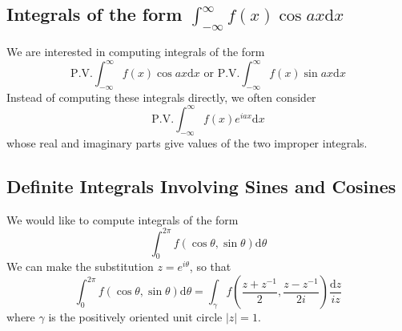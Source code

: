 \documentclass[12pt]{article}
\newcommand{\diff}{\mathrm{d}}
\theoremstyle{definition}
\begin{document}
\subsection{Integrals of the form {$\int_{-\infty}^\infty f(x)\cos ax\diff x$ }}
We are interested in computing integrals of the form
\[
\text{P.V.}\int_{-\infty}^\infty f(x)\cos ax\diff x \text{ or }\text{P.V.}\int_{-\infty}^\infty f(x)\sin ax\diff x
\]
Instead of computing these integrals directly, we often consider 
\[
\text{P.V.}\int_{-\infty}^\infty f(x)e^{iax} \diff x
\]
whose real and imaginary parts give values of the two improper integrals.
\subsection{Definite Integrals Involving Sines and Cosines}
We would like to compute integrals of the form
\[
\int_0^{2\pi} f(\cos\theta, \sin\theta)\diff \theta
\]
We can make the substitution $z=e^{i\theta}$, so that
\[
\int_0^{2\pi}f(\cos\theta, \sin\theta)\diff \theta = \int_\gamma f(\frac{z + z^{-1}}{2}, \frac{z-z^{-1}}{2i})\frac{\diff z}{iz}
\]
where $\gamma$ is the positively oriented unit circle $|z|=1$.
\end{document}
